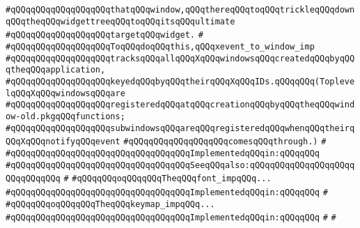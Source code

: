 \verb|#qQQqqQQqqQQqqQQqqQQqthatqQQqwindow,qQQqthereqQQqtoqQQqtrickleqQQqdownqQQqtheqQQqwidgettreeqQQqtoqQQqitsqQQqultimate|\newline
\verb|#qQQqqQQqqQQqqQQqqQQqtargetqQQqwidget.|\newline
\verb|#|\newline
\verb|#qQQqqQQqqQQqqQQqqQQqToqQQqdoqQQqthis,qQQqxevent_to_window_imp|\newline
\verb|#qQQqqQQqqQQqqQQqqQQqtracksqQQqallqQQqXqQQqwindowsqQQqcreatedqQQqbyqQQqtheqQQqapplication,|\newline
\verb|#qQQqqQQqqQQqqQQqqQQqkeyedqQQqbyqQQqtheirqQQqXqQQqIDs.qQQqqQQq(ToplevelqQQqXqQQqwindowsqQQqare|\newline
\verb|#qQQqqQQqqQQqqQQqqQQqregisteredqQQqatqQQqcreationqQQqbyqQQqtheqQQqwindow-old.pkgqQQqfunctions;|\newline
\verb|#qQQqqQQqqQQqqQQqqQQqsubwindowsqQQqareqQQqregisteredqQQqwhenqQQqtheirqQQqXqQQqnotifyqQQqevent|\newline
\verb|#qQQqqQQqqQQqqQQqqQQqcomesqQQqthrough.)|\newline
\verb|#|\newline
\verb|#qQQqqQQqqQQqqQQqqQQqqQQqqQQqqQQqqQQqImplementedqQQqin:qQQqqQQq|\newline
\verb|#qQQqqQQqqQQqqQQqqQQqqQQqqQQqqQQqqQQqSeeqQQqalso:qQQqqQQqqQQqqQQqqQQqqQQqqQQqqQQq|\newline
\verb|#|\newline
\verb|#qQQqqQQqoqQQqqQQqTheqQQqfont_impqQQq...|\newline
\verb|#qQQqqQQqqQQqqQQqqQQqqQQqqQQqqQQqqQQqImplementedqQQqin:qQQqqQQq|\newline
\verb|#|\newline
\verb|#qQQqqQQqoqQQqqQQqTheqQQqkeymap_impqQQq...|\newline
\verb|#qQQqqQQqqQQqqQQqqQQqqQQqqQQqqQQqqQQqImplementedqQQqin:qQQqqQQq|\newline
\verb|#|\newline
\verb|#|\newline
